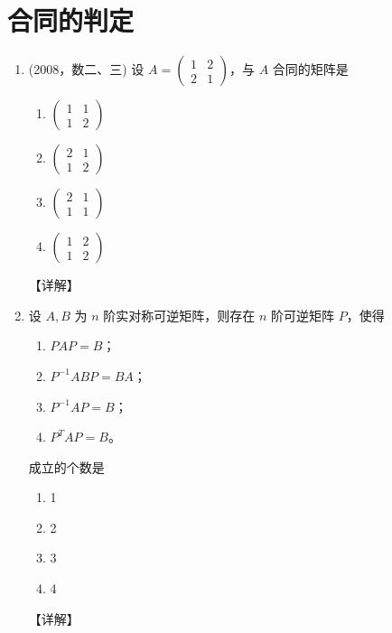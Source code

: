 \documentclass[12pt, a4paper, oneside, UTF8]{ctexbook}
\begin{document}
\section{合同的判定}

\begin{enumerate}[label=\arabic*.,start=4]
    \item (2008，数二、三) 设 $ A = \begin{pmatrix} 1 & 2 \\ 2 & 1 \end{pmatrix} $，与 $ A $ 合同的矩阵是
    \begin{enumerate}
        \item $ \begin{pmatrix} 1 & 1 \\ 1 & 2 \end{pmatrix} $
        \item $ \begin{pmatrix} 2 & 1 \\ 1 & 2 \end{pmatrix} $
        \item $ \begin{pmatrix} 2 & 1 \\ 1 & 1 \end{pmatrix} $
        \item $ \begin{pmatrix} 1 & 2 \\ 1 & 2 \end{pmatrix} $
    \end{enumerate}
    
    \begin{solution}
    【详解】
    \end{solution}
    
    \item 设 $ A, B $ 为 $ n $ 阶实对称可逆矩阵，则存在 $ n $ 阶可逆矩阵 $ P $，使得
    \begin{enumerate}
        \item $ P A P = B $；
        \item $ P^{-1} A B P = B A $；
        \item $ P^{-1} A P = B $；
        \item $ P^T A P = B $。
    \end{enumerate}
    成立的个数是
    \begin{enumerate}
        \item 1
        \item 2
        \item 3
        \item 4
    \end{enumerate}
    
    \begin{solution}
    【详解】
    \end{solution}
\end{enumerate}
\end{document}
